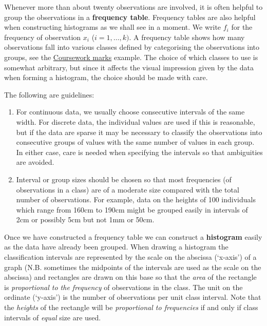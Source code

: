\documentclass[
]{book}
\begin{document}
Whenever more than about twenty observations are involved, it is often
helpful to group the observations in a \textbf{frequency table}. Frequency
tables are also helpful when constructing histograms as we shall see in
a moment. We write \(f_i\) for the frequency of observation \(x_i\)
(\(i = 1,\ldots,k)\). A frequency table shows how many observations fall
into various classes defined by categorising the observations into
groups, see the \protect\hyperlink{intro_example}{Coursework marks} example. The choice of which classes to use is somewhat arbitrary, but
since it affects the visual impression given by the data when forming a
histogram, the choice should be made with care.

The following are guidelines:

\begin{enumerate}
\def\labelenumi{\arabic{enumi}.}
\item
  For continuous data, we usually choose consecutive intervals of the
  same width. For discrete data, the individual values are used if
  this is reasonable, but if the data are sparse it may be necessary
  to classify the observations into consecutive groups of values with
  the same number of values in each group. In either case, care is
  needed when specifying the intervals so that ambiguities are
  avoided.
\item
  Interval or group sizes should be chosen so that most frequencies
  (of observations in a class) are of a moderate size compared with
  the total number of observations. For example, data on the heights
  of 100 individuals which range from 160cm to 190cm might be grouped
  easily in intervals of 2cm or possibly 5cm but not 1mm or 50cm.
\end{enumerate}

Once we have constructed a frequency table we can construct a
\textbf{histogram} easily as the data have already been grouped. When drawing
a histogram the classification intervals are represented by the scale on
the abscissa (`x-axis') of a graph (N.B. sometimes the midpoints of the
intervals are used as the scale on the abscissa) and rectangles are
drawn on this base so that the \emph{area} of the rectangle is \emph{proportional
to the frequency} of observations in the class. The unit on the ordinate
(`y-axis') is the number of observations per unit class interval. Note
that the \emph{heights} of the rectangle will be \emph{proportional to
frequencies} if and only if class intervals of \emph{equal} size are used.
\end{document}

